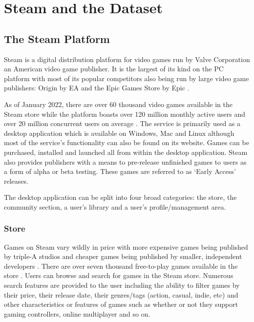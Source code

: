 \chapter{Steam and the Dataset} \label{sec:BG}

\section{The Steam Platform} \label{sec:BG_Steam}

Steam is a digital distribution platform for video games run by Valve Corporation an American video game publisher. It is the largest of its kind on the PC platform \cite{SteamLargestDistributor} with most of its popular competitors also being run by large video game publishers: Origin by EA and the Epic Games Store by Epic \cite{SteamCompetitors}.

As of January 2022, there are over 60 thousand video games available in the Steam store \cite{SteamGameCount} while the platform boasts over 120 million monthly active users \cite{SteamMonthlyUsers} and over 20 million concurrent users on average \cite{SteamConcurrentUsers}. The service is primarily used as a desktop application which is available on Windows, Mac and Linux although most of the service's functionality can also be found on its website. Games can be purchased, installed and launched all from within the desktop application. Steam also provides publishers with a means to pre-release unfinished games to users as a form of alpha or beta testing. These games are referred to as `Early Access' releases.

The desktop application can be split into four broad categories: the store, the community section, a user's library and a user's profile/management area.

\subsection{Store} \label{sec:BG_Steam_Store}

Games on Steam vary wildly in price with more expensive games being published by triple-A studios and cheaper games being published by smaller, independent developers \cite{SteamGamePricing}. There are over seven thousand free-to-play games available in the store \cite{SteamFreeGameCount}. Users can browse and search for games in the Steam store. Numerous search features are provided to the user including the ability to filter games by their price, their release date, their genres/tags (action, casual, indie, etc) and other characteristics or features of games such as whether or not they support gaming controllers, online multiplayer and so on.

